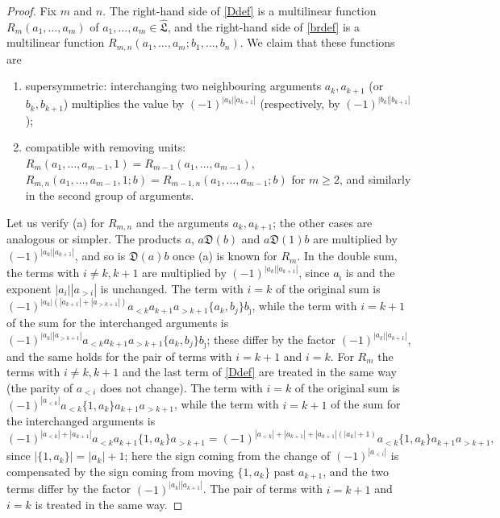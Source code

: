 \documentclass[11pt,reqno]{amsart}
\newcommand{\LL}{\mathfrak L}
\newcommand{\D}{\mathfrak D}
\newcommand{\Lh}{\widehat{\LL}}
\theoremstyle{plain}
\theoremstyle{definition}
\theoremstyle{remark}
\begin{document}
\begin{proof}
Fix $m$ and $n$.
The right-hand side of \eqref{Ddef} is a multilinear function $R_m(a_1,\dots,a_m)$ of $a_1,\dots,a_m\in\Lh$, and the right-hand side of \eqref{brdef} is a multilinear function $R_{m,n}(a_1,\dots,a_m;b_1,\dots,b_n)$.
We claim that these functions are
\begin{enumerate}
\item[(a)] supersymmetric: interchanging two neighbouring arguments $a_k,a_{k+1}$ (or $b_k,b_{k+1}$) multiplies the value by $(-1)^{|a_k||a_{k+1}|}$ (respectively, by $(-1)^{|b_k||b_{k+1}|}$);
\item[(b)] compatible with removing units: $R_m(a_1,\dots,a_{m-1},1)=R_{m-1}(a_1,\dots,a_{m-1})$, $R_{m,n}(a_1,\dots,a_{m-1},1;b)=R_{m-1,n}(a_1,\dots,a_{m-1};b)$ for $m\ge2$, and similarly in the second group of arguments.
\end{enumerate}
Let us verify (a) for $R_{m,n}$ and the arguments $a_k,a_{k+1}$; the other cases are analogous or simpler.
The products $a$, $a\D(b)$ and $a\D(1)b$ are multiplied by $(-1)^{|a_k||a_{k+1}|}$, and so is $\D(a)b$ once (a) is known for $R_m$.
In the double sum, the terms with $i\ne k,k+1$ are multiplied by $(-1)^{|a_k||a_{k+1}|}$, since $a_{\hat\imath}$ is and the exponent $|a_i||a_{>i}|$ is unchanged.
The term with $i=k$ of the original sum is $(-1)^{|a_k|(|a_{k+1}|+|a_{>k+1}|)}a_{<k}a_{k+1}a_{>k+1}\{a_k,b_j\}b_{\hat\jmath}$, while the term with $i=k+1$ of the sum for the interchanged arguments is $(-1)^{|a_k||a_{>k+1}|}a_{<k}a_{k+1}a_{>k+1}\{a_k,b_j\}b_{\hat\jmath}$; these differ by the factor $(-1)^{|a_k||a_{k+1}|}$, and the same holds for the pair of terms with $i=k+1$ and $i=k$.
For $R_m$ the terms with $i\ne k,k+1$ and the last term of \eqref{Ddef} are treated in the same way (the parity of $a_{<i}$ does not change).
The term with $i=k$ of the original sum is $(-1)^{|a_{<k}|}a_{<k}\{1,a_k\}a_{k+1}a_{>k+1}$, while the term with $i=k+1$ of the sum for the interchanged arguments is
$$
(-1)^{|a_{<k}|+|a_{k+1}|}a_{<k}a_{k+1}\{1,a_k\}a_{>k+1}=(-1)^{|a_{<k}|+|a_{k+1}|+|a_{k+1}|(|a_k|+1)}a_{<k}\{1,a_k\}a_{k+1}a_{>k+1},
$$
since $|\{1,a_k\}|=|a_k|+1$; here the sign coming from the change of $(-1)^{|a_{<i}|}$ is compensated by the sign coming from moving $\{1,a_k\}$ past $a_{k+1}$, and the two terms differ by the factor $(-1)^{|a_k||a_{k+1}|}$.
The pair of terms with $i=k+1$ and $i=k$ is treated in the same way.


\end{proof}
\end{document}
